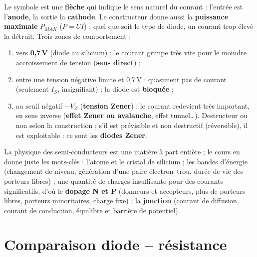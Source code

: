 \begin{defnbox}[title=Symbole et caractéristique]
Le symbole est une \textbf{flèche} qui indique le sens naturel du courant : l'entrée est
l'\textbf{anode}, la sortie la \textbf{cathode}. Le constructeur donne aussi la
\textbf{puissance maximale} $P_{MAX}$ ($P = UI$) : quel que soit le type de diode, un courant
trop élevé la détruit. Trois zones de comportement :
\begin{enumerate}
  \item vers \textbf{0,7\,V} (diode au silicium) : le courant grimpe très vite pour le
        moindre accroissement de tension (\textbf{sens direct}) ;
  \item entre une tension négative limite et 0,7\,V : quasiment pas de courant (seulement
        $I_S$, insignifiant) : la diode est \textbf{bloquée} ;
  \item au seuil négatif $-V_Z$ (\textbf{tension Zener}) : le courant redevient très
        important, en sens inverse (\textbf{effet Zener ou avalanche}, effet tunnel\ldots).
        Destructeur ou non selon la construction ; s'il est prévisible et non destructif
        (réversible), il est exploitable : ce sont les \textbf{diodes Zener}.
\end{enumerate}
\end{defnbox}


\begin{rembox}[title={Petite parenthèse : semi-conducteurs (hors du c\oe ur du cours)}]
La physique des semi-conducteurs est une matière à part entière ; le cours en donne juste les
mots-clés : l'atome et le cristal de silicium ; les bandes d'énergie (changement de niveau,
génération d'une paire électron--trou, durée de vie des porteurs libres) ; une quantité de
charges insuffisante pour des courants significatifs, d'où le \textbf{dopage N et P}
(donneurs et accepteurs, plus de porteurs libres, porteurs minoritaires, charge fixe) ; la
\textbf{jonction} (courant de diffusion, courant de conduction, équilibre et barrière de
potentiel).
\end{rembox}

\section{Comparaison diode -- résistance}


